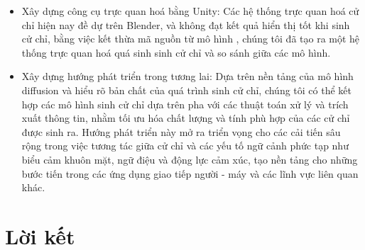 \begin{itemize}
	\item Xây dựng công cụ trực quan hoá bằng Unity: Các hệ thống trực quan hoá cử chỉ hiện nay đề dự trên Blender, và không đạt kết quả hiển thị tốt khi sinh cử chỉ, bằng việc kết thừa mã nguồn từ mô hình \cite{starke2022deepphase}, chúng tôi đã tạo ra một hệ thống trực quan hoá quá sinh sinh cử chỉ và so sánh giữa các mô hình. 
	
	\item Xây dựng hướng phát triển trong tương lai: Dựa trên nền tảng của mô hình diffusion và hiểu rõ bản chất của quá trình sinh cử chỉ, chúng tôi có thể kết hợp các mô hình sinh cử chỉ dựa trên pha với các thuật toán xử lý và trích xuất thông tin, nhằm tối ưu hóa chất lượng và tính phù hợp của các cử chỉ được sinh ra. Hướng phát triển này mở ra triển vọng cho các cải tiến sâu rộng trong việc tương tác giữa cử chỉ và các yếu tố ngữ cảnh phức tạp như biểu cảm khuôn mặt, ngữ điệu và động lực cảm xúc, tạo nền tảng cho những bước tiến trong các ứng dụng giao tiếp người - máy và các lĩnh vực liên quan khác.
\end{itemize}








\section{Lời kết}







